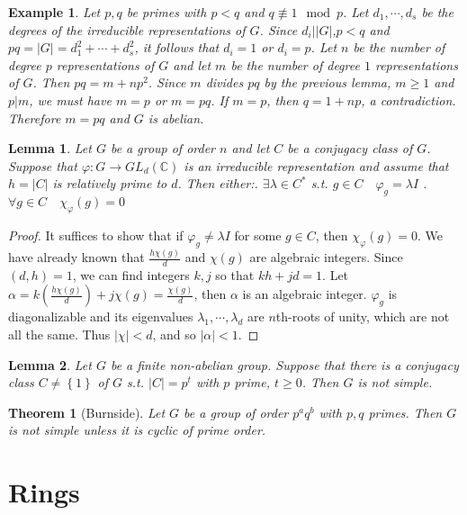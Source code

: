 \documentclass{article}
\newtheorem{Thm}{Theorem}[section]
\newtheorem{Lem}{Lemma}[section]
\newtheorem{Eg}{Example}[section]
\theoremstyle{definition}
\begin{document}
\begin{Eg}
    Let $p,q$ be primes with $p<q$ and $q\not\equiv 1\mod{p}$. Let $d_1,\cdots,d_s$ be the degrees of the irreducible representations of $G$.
    Since $d_i|\left|G\right|$,$p<q$ and $pq=\left|G\right|=d_1^2+\cdots+d_s^2$, it follows that $d_i=1$ or $d_i=p$. Let $n$ be the number of degree $p$ representations of $G$ and
    let $m$ be the number of degree $1$ representations of $G$. Then $pq=m+np^2$. Since $m$ divides $pq$ by the previous lemma, $m\ge 1$ and $p|m$, we must have $m=p$ or $m=pq$. If $m=p$, then $q=1+np$, a contradiction.
    Therefore $m=pq$ and $G$ is abelian.
\end{Eg}

\begin{Lem}
    Let $G$ be a group of order $n$ and let $C$ be a conjugacy class of $G$. Suppose that $\varphi:G\to GL_d(\mathbb{C})$ is an irreducible representation and assume that $h=\left|C\right|$ is relatively prime to $d$. Then either:. $\exists\lambda\in C^*$ s.t. $g\in C\quad\varphi_g=\lambda I$ . $\forall g\in C\quad\chi_\varphi(g)=0$
\end{Lem}
\begin{proof}
    It suffices to show that if $\varphi_g\ne\lambda I$ for some $g\in C$, then $\chi_\varphi(g)=0$.
    We have already known that $\frac{h\chi(g)}{d} $ and $\chi(g)$ are algebraic integers. Since $(d,h)=1$,
    we can find integers $k,j$ so that $kh+jd=1$. Let $\alpha=k(\frac{h\chi(g)}{d})+j\chi(g)=\frac{\chi(g)}{d}$, then $\alpha$ is an algebraic integer.
    $\varphi_g$ is diagonalizable and its eigenvalues $\lambda_1,\cdots,\lambda_d$ are $n$th-roots of unity, which are not all the same.
    Thus $\left|\chi\right|<d$, and so $\left|\alpha\right|<1$.
\end{proof}

\begin{Lem}
    Let $G$ be a finite non-abelian group. Suppose that there is a conjugacy class $C\ne\left\{1\right\}$ of $G$ s.t. $\left|C\right|=p^t$ with $p$ prime, $t\ge 0$. Then $G$ is not simple.
\end{Lem}

\begin{Thm}[Burnside]
    Let $G$ be a group of order $p^aq^b$ with $p,q$ primes. Then $G$ is not simple unless it is cyclic of prime order.
\end{Thm}
\section{Rings}
\end{document}

